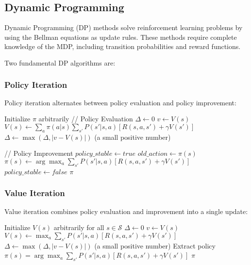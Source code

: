 \documentclass{article}
\begin{document}
\subsection{Dynamic Programming}

Dynamic Programming (DP) methods solve reinforcement learning problems by using the Bellman equations as update rules. These methods require complete knowledge of the MDP, including transition probabilities and reward functions.

Two fundamental DP algorithms are:

\subsubsection{Policy Iteration}

Policy iteration alternates between policy evaluation and policy improvement:

\begin{algorithm}
\begin{algorithmic}[1]
\STATE Initialize $\pi$ arbitrarily
\REPEAT
    \STATE // Policy Evaluation
    \REPEAT
        \STATE $\Delta \leftarrow 0$
            \STATE $v \leftarrow V(s)$
            \STATE $V(s) \leftarrow \sum_{a} \pi(a|s) \sum_{s'} P(s'|s,a)[R(s,a,s') + \gamma V(s')]$
            \STATE $\Delta \leftarrow \max(\Delta, |v - V(s)|)$
        \ENDFOR
    \UNTIL{$\Delta < \theta$} (a small positive number)
    
    \STATE // Policy Improvement
    \STATE $policy\_stable \leftarrow true$
        \STATE $old\_action \leftarrow \pi(s)$
        \STATE $\pi(s) \leftarrow \arg\max_a \sum_{s'} P(s'|s,a)[R(s,a,s') + \gamma V(s')]$
            \STATE $policy\_stable \leftarrow false$
        \ENDIF
    \ENDFOR
{}
\RETURN $\pi$
\end{algorithmic}
\end{algorithm}

\subsubsection{Value Iteration}

Value iteration combines policy evaluation and improvement into a single update:

\begin{algorithm}
\begin{algorithmic}[1]
\STATE Initialize $V(s)$ arbitrarily for all $s \in \mathcal{S}$
\REPEAT
    \STATE $\Delta \leftarrow 0$
        \STATE $v \leftarrow V(s)$
        \STATE $V(s) \leftarrow \max_a \sum_{s'} P(s'|s,a)[R(s,a,s') + \gamma V(s')]$
        \STATE $\Delta \leftarrow \max(\Delta, |v - V(s)|)$
    \ENDFOR
\UNTIL{$\Delta < \theta$} (a small positive number)
\STATE Extract policy $\pi(s) = \arg\max_a \sum_{s'} P(s'|s,a)[R(s,a,s') + \gamma V(s')]$
\RETURN $\pi$
\end{algorithmic}
\end{algorithm}
\end{document}
